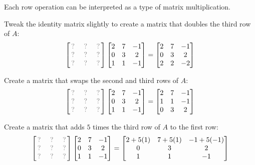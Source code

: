 \begin{applicationActivities}
\begin{activity}{20}
Each row operation can be interpreted as a type of matrix multiplication.
\begin{subactivity}
Tweak the identity matrix slightly to create a matrix that
doubles the third row of $A$:
\[
 \begin{bmatrix} \unknown & \unknown & \unknown \\ \unknown & \unknown & \unknown \\ \unknown & \unknown & \unknown \end{bmatrix}
 \begin{bmatrix} 2 & 7 & -1 \\ 0 & 3 & 2 \\ 1 & 1 & -1 \end{bmatrix}
=
 \begin{bmatrix} 2 & 7 & -1 \\ 0 & 3 & 2 \\ 2 & 2 & -2 \end{bmatrix}
\]
\end{subactivity}
\begin{subactivity}
  Create a matrix that swaps the second and third rows of $A$:
  \[
   \begin{bmatrix} \unknown & \unknown & \unknown \\ \unknown & \unknown & \unknown \\ \unknown & \unknown & \unknown \end{bmatrix}
   \begin{bmatrix} 2 & 7 & -1 \\ 0 & 3 & 2 \\ 1 & 1 & -1 \end{bmatrix}
  =
  \begin{bmatrix} 2 & 7 & -1 \\ 1 & 1 & -1 \\ 0 & 3 & 2 \end{bmatrix}
  \]
\end{subactivity}
\begin{subactivity}
Create a matrix that adds $5$ times the third row of $A$ to the first row:
\[
 \begin{bmatrix} \unknown & \unknown & \unknown \\ \unknown & \unknown & \unknown \\ \unknown & \unknown & \unknown \end{bmatrix}
 \begin{bmatrix} 2 & 7 & -1 \\ 0 & 3 & 2 \\ 1 & 1 & -1 \end{bmatrix}
=
 \begin{bmatrix} 2+5(1) & 7+5(1) & -1+5(-1) \\ 0 & 3 & 2 \\ 1 & 1 & -1 \end{bmatrix}
\]
\end{subactivity}
\end{activity}


\end{applicationActivities}
